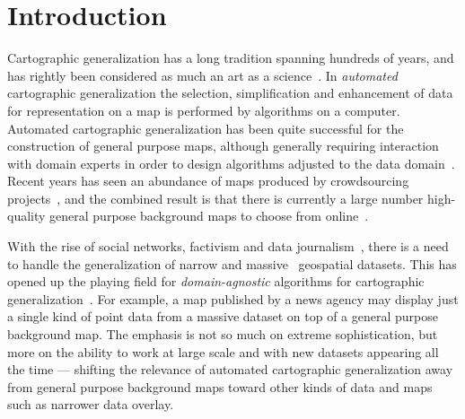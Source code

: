 \section{Introduction}






Cartographic generalization has a long tradition spanning hundreds of years, and has rightly been considered as much an art as a science~\cite{rieger1993consensus}. In \emph{automated} cartographic generalization the selection, simplification and enhancement of data for representation on a map is performed by algorithms on a computer. Automated cartographic generalization has been quite successful for the construction of general purpose maps, although generally requiring interaction with domain experts in order to design algorithms adjusted to the data domain~\cite{cecconi2003integration,schmid2008automated,regnauld2006improving}. Recent years has seen an abundance of maps produced by crowdsourcing projects~\cite{openstreetmap}, and the combined result is that there is currently a large number high-quality general purpose background maps to choose from online~\cite{}.

With the rise of social networks, factivism and data journalism~\cite{sankaranarayanan2009twitterstand,bono,cohen2011journalism}, there is a need to handle the generalization of narrow and massive~\cite{twitter,datablog} geospatial datasets. This has opened up the playing field for \emph{domain-agnostic} algorithms for cartographic generalization~\cite{sarma2012fusiontables,nutanong2012multiresolution}. For example, a map published by a news agency may display just a single kind of point data from a massive dataset on top of a general purpose background map. The emphasis is not so much on extreme sophistication, but more on the ability to work at large scale and with new datasets appearing all the time  --- shifting the relevance of automated cartographic generalization away from general purpose background maps toward other kinds of data and maps such as narrower data overlay.

